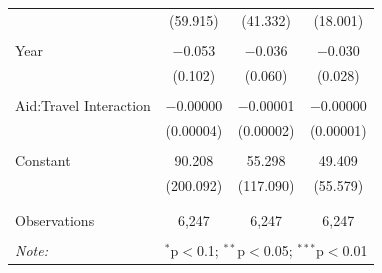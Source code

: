 \documentclass[12pt, letterpaper]{article}
\begin{document}
\begin{table}[!htbp]
\begin{tabular}{@{\extracolsep{5pt}}lccc}
		& (59.915) & (41.332) & (18.001) \\ 
		& & & \\ 
		Year & $-$0.053 & $-$0.036 & $-$0.030 \\ 
		& (0.102) & (0.060) & (0.028) \\ 
		& & & \\ 
		Aid:Travel Interaction & $-$0.00000 & $-$0.00001 & $-$0.00000 \\ 
		& (0.00004) & (0.00002) & (0.00001) \\ 
		& & & \\ 
		Constant & 90.208 & 55.298 & 49.409 \\ 
		& (200.092) & (117.090) & (55.579) \\ 
		& & & \\ 
		\hline \\[-1.8ex] 
		Observations & 6,247 & 6,247 & 6,247 \\ 
		\hline 
		\hline \\[-1.8ex] 
		\textit{Note:}  & \multicolumn{3}{r}{$^{*}$p$<$0.1; $^{**}$p$<$0.05; $^{***}$p$<$0.01} \\ 
	\end{tabular} 
	\label{yearly2000nopop}
\end{table} 
\end{document}
